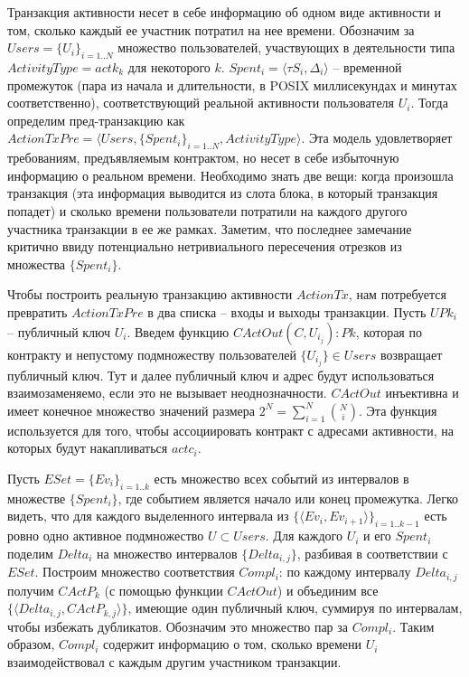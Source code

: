 \documentclass[]{itmo-student-thesis}
\begin{document}
Транзакция активности несет в себе информацию об одном виде активности
и том, сколько каждый ее участник потратил на нее времени. Обозначим
за $Users = \{U_i\}_{i=1..N}$ множество пользователей, участвующих в
деятельности типа $ActivityType = actk_k$ для некоторого $k$. $Spent_i
= \langle \tau S_i, \Delta_i \rangle$ -- временной промежуток (пара из
начала и длительности, в POSIX миллисекундах и минутах
соответственно), соответствующий реальной активности пользователя
$U_i$. Тогда определим пред-транзакцию как $ActionTxPre = \langle
Users, \{Spent_i\}_{i=1..N}, ActivityType \rangle$. Эта модель
удовлетворяет требованиям, предъявляемым контрактом, но несет в себе
избыточную информацию о реальном времени. Необходимо знать две вещи:
когда произошла транзакция (эта информация выводится из слота блока, в
который транзакция попадет) и сколько времени пользователи потратили
на каждого другого участника транзакции в ее же рамках. Заметим, что
последнее замечание критично ввиду потенциально нетривиального
пересечения отрезков из множества $\{Spent_i\}$.

Чтобы построить реальную транзакцию активности $ActionTx$, нам
потребуется превратить $ActionTxPre$ в два списка -- входы и выходы
транзакции. Пусть $UPk_i$ -- публичный ключ $U_i$. Введем функцию
$CActOut(C, {U_{i_j}}) : Pk$, которая по контракту и непустому
подмножеству пользователей $\{U_{i_j}\} \in Users$ возвращает
публичный ключ. Тут и далее публичный ключ и адрес будут
использоваться взаимозаменяемо, если это не вызывает
неоднозначности. $CActOut$ инъективна и имеет конечное множество
значений размера $2^N = \sum_{i=1}^N{\binom{N}{i}}$. Эта функция
используется для того, чтобы ассоциировать контракт с адресами
активности, на которых будут накапливаться $actc_i$.

Пусть $ESet = \{Ev_i\}_{i=1..k}$ есть множество всех событий из
интервалов в множестве $\{Spent_i\}$, где событием является начало или
конец промежутка. Легко видеть, что для каждого выделенного интервала
из $\{\langle Ev_i, Ev_{i+1} \rangle\}_{i=1..k-1}$ есть ровно одно
активное подмножество $U \subset Users$. Для каждого $U_i$ и его
$Spent_i$ поделим $Delta_i$ на множество интервалов $\{Delta_{i,j}\}$,
разбивая в соответствии с $ESet$. Построим множество соответствия
$Compl_i$: по каждому интервалу $Delta_{i,j}$ получим $CActP_k$ (с
помощью функции $CActOut$) и объединим все $\{\langle Delta_{i,j},
CActP_{k,j}\rangle\}$, имеющие один публичный ключ, суммируя по
интервалам, чтобы избежать дубликатов. Обозначим это множество пар за
$Compl_i$. Таким образом, $Compl_i$ содержит информацию о том, сколько
времени $U_i$ взаимодействовал с каждым другим участником транзакции.
\end{document}
